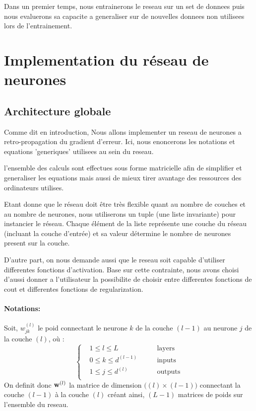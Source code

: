 \documentclass[11pt]{article}
\begin{document}
Dans un premier temps, nous entrainerons le reseau sur un set de donnees puis
nous evaluerons sa capacite a generaliser sur de nouvelles donnees non utilisees
lors de l'entrainement.

\section{Implementation du r\'eseau de neurones}
\subsection{Architecture globale}
Comme dit en introduction, Nous allons implementer un reseau de neurones a
retro-propagation du gradient d'erreur. Ici, nous enoncerons les notations et
equations 'generiques' utilisees au sein du reseau.

l'ensemble des calculs sont effectues sous forme matricielle afin de simplifier
et generaliser les equations mais aussi de mieux tirer avantage des ressources
des ordinateurs utilises.

Etant donne que le r\'eseau doit \^etre tr\`es flexible quant au nombre de
couches et au nombre de neurones, nous utiliserons un tuple (une liste
invariante) pour instancier le r\'eseau.
Chaque \'el\'ement de la liste repr\'esente une couche du r\'eseau
(incluant la couche d'entr\'ee) et sa valeur d\'etermine le nombre de neurones
present sur la couche.

D'autre part, on nous demande aussi que le reseau soit capable d'utiliser
differentes fonctions d'activation. Base sur cette contrainte, nous avons
choisi d'aussi donner a l'utilisateur la possibilite de choisir entre differentes
fonctions de cout et differentes fonctions de regularization.

\paragraph{Notations: }Soit, $w_{jk}^{(l)}$ le poid connectant le neurone $k$
de la couche $(l-1)$ au neurone $j$ de la couche $(l)$, o\`u :
$$
\left \{
	\begin{aligned}
		&1 \le l \le L         &\qquad \text{layers} \\
		&0 \le k \le d^{(l-1)} &\qquad \text{inputs} \\
		&1 \le j \le d^{(l)}   &\qquad \text{outputs}\\
	\end{aligned}
\right .
$$
On definit donc ${\bf w}^{(l)}$ la matrice de dimension $\Big((l) \times (l-1)\Big)$
connectant la couche $(l-1)$ \`a la couche $(l)$ cr\'eant ainsi, $(L-1)$ matrices
de poids sur l'ensemble du reseau. \\
\end{document}
